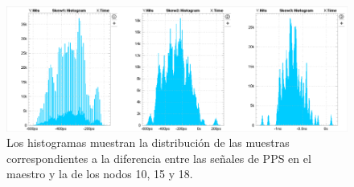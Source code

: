 \begin{figure}
	\centering
	\includegraphics[width=0.7\linewidth]{imagenes/hist_exp3}
	\caption[Histograma para cadena de 18 WR-LEN]{Los histogramas muestran la 
		distribución de las muestras correspondientes a la diferencia entre las 
		señales de PPS en el maestro y la de los nodos 10, 15 y 18.}
	\label{fig:histexp3}
\end{figure}


